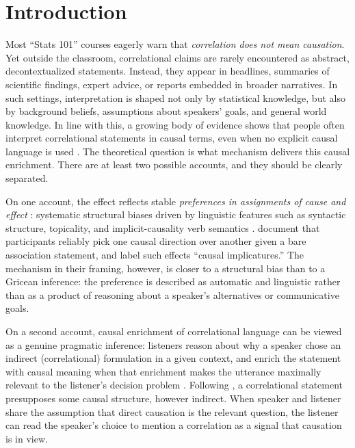 \documentclass[10pt,letterpaper]{article}
\begin{document}
\section{Introduction}

Most ``Stats 101'' courses eagerly warn that \textit{correlation does not mean causation}.
Yet outside the classroom, correlational claims are rarely encountered as abstract, decontextualized statements.
Instead, they appear in headlines, summaries of scientific findings, expert advice, or reports embedded in broader narratives.
In such settings, interpretation is shaped not only by statistical knowledge, but also by background beliefs, assumptions about speakers' goals, and general world knowledge.
In line with this, a growing body of evidence shows that people often interpret correlational statements in causal terms, even when no explicit causal language is used \citep{adams2017readers,huff2023lie,seifert2022causal}.
The theoretical question is what mechanism delivers this causal enrichment.
There are at least two possible accounts, and they should be clearly separated.

On one account, the effect reflects stable \emph{preferences in assignments of cause and effect} \citep{lassiter2024rationality}: systematic structural biases driven by linguistic features such as syntactic structure, topicality, and implicit-causality verb semantics \citep{hartshorne_what_2014,bott_verbs_2014}.
\citet{gershman_causal_2023} document that participants reliably pick one causal direction over another given a bare association statement, and label such effects ``causal implicatures.''
The mechanism in their framing, however, is closer to a structural bias than to a Gricean inference: the preference is described as automatic and linguistic rather than as a product of reasoning about a speaker's alternatives or communicative goals.

On a second account, causal enrichment of correlational language can be viewed as a genuine pragmatic inference: listeners reason about why a speaker chose an indirect (correlational) formulation in a given context, and enrich the statement with causal meaning when that enrichment makes the utterance maximally relevant to the listener's decision problem \citep{SperberWilson1995,BenzvanRooijOptimalAssertions2007,goodman2016pragmatic}.
Following \citet{reichenbach1991direction}, a correlational statement presupposes some causal structure, however indirect.
When speaker and listener share the assumption that direct causation is the relevant question, the listener can read the speaker's choice to mention a correlation as a signal that causation is in view.
\end{document}
